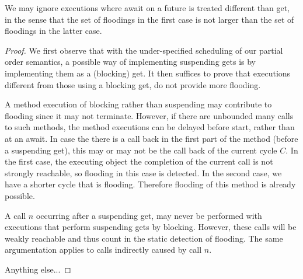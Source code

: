 \begin{lemma}
\label{lemma-await}
 We may ignore executions where await on a future is 
treated different than get, in the sense that the set of floodings
in the first case is not larger than the set of floodings in the 
latter case.
\end{lemma} 
\begin{proof}
We first observe that 
with the under-specified scheduling of our partial order semantics,
a possible way of implementing suspending gets is
by implementing them as a (blocking) get.
It then suffices to prove that 
executions different from those using a blocking get,
do not provide more flooding.

A method execution of blocking rather than suspending
may contribute to flooding since it may not terminate.
However, if there are unbounded many calls to such methods,
the method executions can be delayed before start, rather than
at an await. 
In case the there is a call back in the first part of the method
(before a suspending get), 
this may or may not be the call back of the current cycle $C$.
In the first case, the executing object 
the completion of the current call is not strongly reachable,
so flooding in this case is detected.
In the second case,
we have a shorter cycle that is flooding.
Therefore  flooding of this method is already possible.

A call $n$ occurring after a suspending get, may never be
performed with executions that perform  suspending gets by blocking.
 However, these calls will be weakly reachable
and thus count in the static  detection of flooding.
The same argumentation applies to calls indirectly caused by %
call $n$.


Anything else...

\end{proof}



